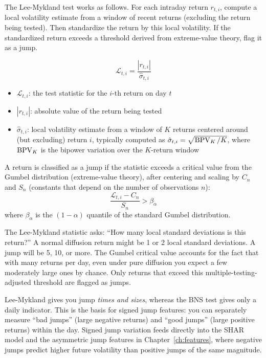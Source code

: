 The Lee-Mykland test works as follows.
For each intraday return $r_{t,i}$, compute a local volatility estimate from a window of recent returns (excluding the return being tested).
Then standardize the return by this local volatility.
If the standardized return exceeds a threshold derived from extreme-value theory, flag it as a jump.

\begin{definition}
\begin{equation}
  \mathcal{L}_{t,i} = \frac{|r_{t,i}|}{\hat{\sigma}_{t,i}}
  \label{eq:lm-stat}
\end{equation}
\begin{itemize}[nosep]
  \item $\mathcal{L}_{t,i}$: the test statistic for the $i$-th return on day $t$
  \item $|r_{t,i}|$: absolute value of the return being tested
  \item $\hat{\sigma}_{t,i}$: local volatility estimate from a window of $K$ returns centered around (but excluding) return $i$, typically computed as $\hat{\sigma}_{t,i} = \sqrt{\operatorname{BPV}_K / K}$, where $\operatorname{BPV}_K$ is the bipower variation over the $K$-return window
\end{itemize}
A return is classified as a jump if the statistic exceeds a critical value from the Gumbel distribution (extreme-value theory), after centering and scaling by $C_n$ and $S_n$ (constants that depend on the number of observations $n$):
\begin{equation}
  \frac{\mathcal{L}_{t,i} - C_n}{S_n} > \beta_\alpha
  \label{eq:lm-rejection}
\end{equation}
where $\beta_\alpha$ is the $(1-\alpha)$ quantile of the standard Gumbel distribution.

\begin{intuition}
The Lee-Mykland statistic asks: ``How many local standard deviations is this return?''
A normal diffusion return might be 1 or 2 local standard deviations.
A jump will be 5, 10, or more.
The Gumbel critical value accounts for the fact that with many returns per day, even under pure diffusion you expect a few moderately large ones by chance.
Only returns that exceed this multiple-testing-adjusted threshold are flagged as jumps.
\end{intuition}
\end{definition}

\begin{projectconnection}
Lee-Mykland gives you jump \emph{times and sizes}, whereas the BNS test gives only a daily indicator.
This is the basis for signed jump features: you can separately measure ``bad jumps'' (large negative returns) and ``good jumps'' (large positive returns) within the day.
Signed jump variation feeds directly into the SHAR model and the asymmetric jump features in Chapter~\ref{ch:features}, where negative jumps predict higher future volatility than positive jumps of the same magnitude.
\end{projectconnection}

